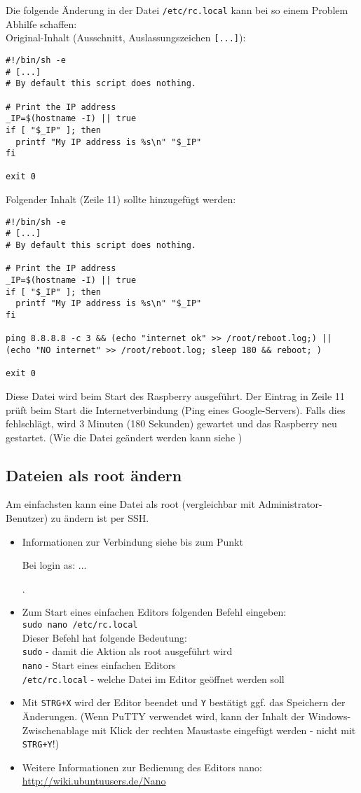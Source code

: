 Die folgende Änderung in der Datei \lstinline|/etc/rc.local| kann bei so einem Problem Abhilfe schaffen:\\
Original-Inhalt (Ausschnitt, Auslassungszeichen \lstinline|[...]|):
\begin{lstlisting}
#!/bin/sh -e
# [...]
# By default this script does nothing.

# Print the IP address
_IP=$(hostname -I) || true
if [ "$_IP" ]; then
  printf "My IP address is %s\n" "$_IP"
fi

exit 0
\end{lstlisting}
Folgender Inhalt (Zeile 11) sollte hinzugefügt werden:
\begin{lstlisting}
#!/bin/sh -e
# [...]
# By default this script does nothing.

# Print the IP address
_IP=$(hostname -I) || true
if [ "$_IP" ]; then
  printf "My IP address is %s\n" "$_IP"
fi

ping 8.8.8.8 -c 3 && (echo "internet ok" >> /root/reboot.log;) || (echo "NO internet" >> /root/reboot.log; sleep 180 && reboot; )

exit 0
\end{lstlisting}
Diese Datei wird beim Start des Raspberry ausgeführt. Der Eintrag in Zeile 11 prüft beim Start die Internetverbindung (Ping eines Google-Servers). Falls dies fehlschlägt, wird 3 Minuten (180 Sekunden) gewartet und das Raspberry neu gestartet. (Wie die Datei geändert werden kann siehe )

\subsection{Dateien als root ändern}
\label{sec:dateiaendern}
Am einfachsten kann eine Datei als root (vergleichbar mit Administrator-Benutzer) zu ändern ist per SSH.
\begin{itemize}
	\item {Informationen zur Verbindung siehe  bis zum Punkt \begin{em}Bei login as: ...\end{em}.}
	\item {Zum Start eines einfachen Editors folgenden Befehl eingeben:\\ \lstinline|sudo nano /etc/rc.local|\\
		Dieser Befehl hat folgende Bedeutung:\\
		\lstinline|sudo| - damit die Aktion als root ausgeführt wird\\
		\lstinline|nano| - Start eines einfachen Editors\\
		\lstinline|/etc/rc.local| - welche Datei im Editor geöffnet werden soll
		}
	\item {Mit \lstinline|STRG+X| wird der Editor beendet und \lstinline|Y| bestätigt ggf. das Speichern der Änderungen.
		(Wenn PuTTY verwendet wird, kann der Inhalt der Windows-Zwischenablage mit Klick der rechten Maustaste eingefügt werden - nicht mit \lstinline|STRG+Y|!)
		}
	\item {Weitere Informationen zur Bedienung des Editors nano:\\ \url{http://wiki.ubuntuusers.de/Nano}
		}
\end{itemize}

